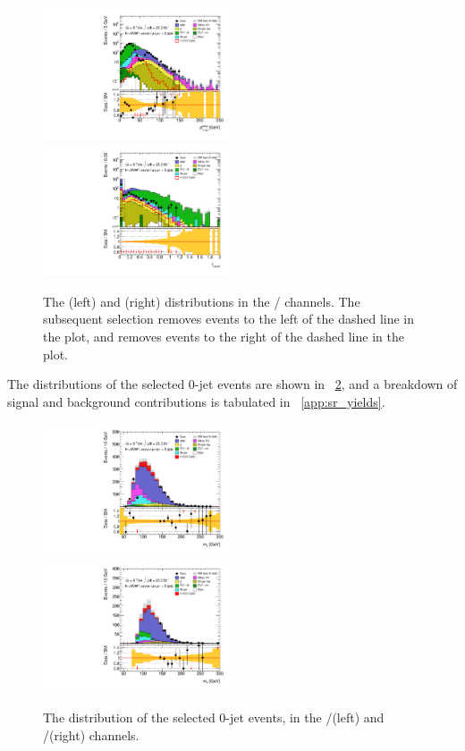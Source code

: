 \begin{figure}
	\includegraphics[width=0.495\textwidth]{tex/selection/eemm_CutTopoMll_0jet_METRel_TrackHWW_mh125_log}
	\hfill
	\includegraphics[width=0.495\textwidth]{tex/selection/eemm_CutTopoDPhill_0jet_f_recoil_mh125_log}
	\caption{The \trackmetrel (left) and \frecoil (right) distributions in the \eech/\mmch 
	channels. The subsequent selection removes events to the left of the dashed line in the 
	\trackmetrel plot, and removes events to the right of the dashed line in the \frecoil 
	plot.}
	\label{fig:sel:0j:sf_cuts}
\end{figure}

The \mt distributions of the selected 0-jet events are shown in \Figure~\ref{fig:sel:0j:mt}, 
and a breakdown of signal and background contributions is tabulated in 
\Appendix~\ref{app:sr_yields}.

\begin{figure}
	\includegraphics[width=0.495\textwidth]{tex/selection/emme_CutFRecoil_0jet_MT_TrackHWW_Clj_mh125_lin}
	\hfill
	\includegraphics[width=0.495\textwidth]{tex/selection/eemm_CutFRecoil_0jet_MT_TrackHWW_Clj_mh125_lin}
	\caption{The \mt distribution of the selected 0-jet events, in the \emch/\mech (left) 
	and \eech/\mmch (right) channels.}
	\label{fig:sel:0j:mt}
\end{figure}




